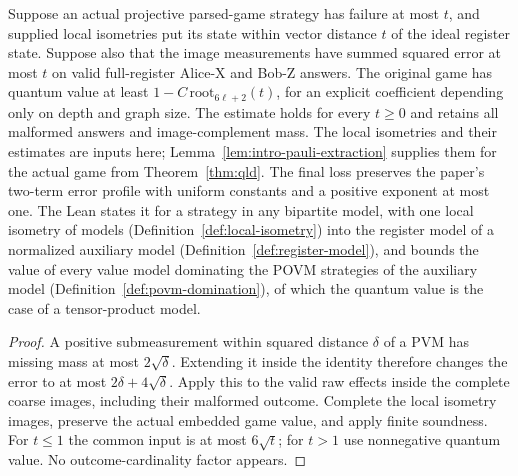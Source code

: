 \begin{lemma}
\label{lem:intro-valid-isometric-soundness}
\leanok
Suppose an actual projective parsed-game strategy has failure at most $t$,
and supplied local isometries put its state within vector distance $t$ of
the ideal register state. Suppose also that the image measurements have
summed squared error at most $t$ on valid full-register Alice-X and Bob-Z
answers. The original game has quantum value at least
$1-C\,\mathrm{root}_{6\ell+2}(t)$, for an explicit coefficient depending
only on depth and graph size. The estimate holds for every $t\geq0$ and
retains all malformed answers and image-complement mass. The local
isometries and their estimates are inputs here; Lemma~\ref{lem:intro-pauli-extraction}
supplies them for the actual game from Theorem~\ref{thm:qld}.
The final loss preserves the paper's two-term error profile with uniform
constants and a positive exponent at most one.
The Lean states it for a strategy in any bipartite model, with one local isometry of models
(Definition~\ref{def:local-isometry}) into the register model of a normalized auxiliary model
(Definition~\ref{def:register-model}), and bounds the value of every value model dominating the
POVM strategies of the auxiliary model (Definition~\ref{def:povm-domination}), of which the quantum
value is the case of a tensor-product model.
\end{lemma}
\begin{proof}
\leanok
A positive submeasurement within squared distance $\delta$ of a PVM has
missing mass at most $2\sqrt\delta$. Extending it inside the identity
therefore changes the error to at most $2\delta+4\sqrt\delta$.
Apply this to the valid raw effects inside the complete coarse images,
including their malformed outcome. Complete the local isometry images,
preserve the actual embedded game value, and apply finite soundness.
For $t\leq1$ the common input is at most $6\sqrt t$; for $t>1$ use
nonnegative quantum value. No outcome-cardinality factor appears.
\end{proof}

